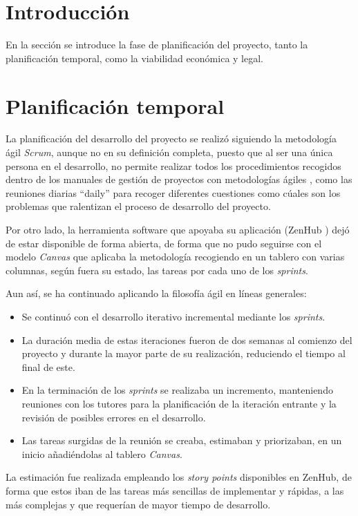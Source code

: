 
\section{Introducción}
En la sección se introduce la fase de planificación del proyecto, tanto la planificación temporal, como
la viabilidad económica y legal.

\section{Planificación temporal}
La planificación del desarrollo del proyecto se realizó siguiendo la metodología ágil \textit{Scrum}, aunque no en su definición completa, puesto
que al ser una única persona en el desarrollo, no permite realizar todos los procedimientos recogidos dentro de los manuales de gestión de proyectos
con metodologías ágiles \cite{book:palacio2021}, como las reuniones diarias ``daily'' para recoger diferentes cuestiones como cúales son los 
problemas que ralentizan el proceso de desarrollo del proyecto.

Por otro lado, la herramienta software que apoyaba su aplicación (ZenHub \cite{misc:zenhub2023}) dejó de estar disponible de forma abierta, de forma
que no pudo seguirse con el modelo \textit{Canvas} que aplicaba la metodología recogiendo en un tablero con varias columnas, según fuera su estado, las 
tareas por cada uno de los \textit{sprints}.

Aun así, se ha continuado aplicando la filosofía ágil en líneas generales:
\begin{itemize}
    \item Se continuó con el desarrollo iterativo incremental mediante los \textit{sprints}.
    \item La duración media de estas iteraciones fueron de dos semanas al comienzo del proyecto y durante
        la mayor parte de su realización, reduciendo el tiempo al final de este.
    \item En la terminación de los \textit{sprints} se realizaba un incremento, manteniendo reuniones con los 
        tutores para la planificación de la iteración entrante y la revisión de posibles errores en el desarrollo.
    \item Las tareas surgidas de la reunión se creaba, estimaban y priorizaban, en un inicio añadiéndolas al tablero
        \textit{Canvas}.
\end{itemize}

La estimación fue realizada empleando los \textit{story points} disponibles en ZenHub, de forma que estos iban de las 
tareas más sencillas de implementar y rápidas, a las más complejas y que requerían de mayor tiempo
de desarrollo.

